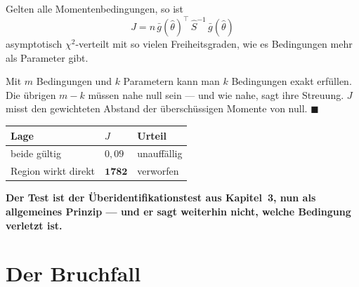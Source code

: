 \begin{merksatz}
Gelten alle Momentenbedingungen, so ist
\[ J = n\,\bar g(\hat\theta)^{\top}\,\hat S^{-1}\,\bar g(\hat\theta) \]
asymptotisch $\chi^{2}$-verteilt mit so vielen Freiheitsgraden, wie es Bedingungen mehr als Parameter gibt.

Mit $m$ Bedingungen und $k$ Parametern kann man $k$ Bedingungen exakt erfüllen. Die übrigen $m-k$ müssen  nahe null sein --- und wie nahe, sagt ihre Streuung. $J$ misst den gewichteten Abstand der überschüssigen Momente von null. $\blacksquare$

\begin{center}
{\small
\renewcommand{\arraystretch}{1.48}
\begin{tabular}{@{}P{3.2cm}P{2.0cm}P{2.4cm}@{}}
\toprule
\textbf{Lage} & $J$ & \textbf{Urteil}\\
\midrule
beide gültig & $0{,}09$ & \textcolor{gruen}{unauffällig}\\
Region wirkt direkt & $\mathbf{1782}$ & \textcolor{akzent}{verworfen}\\
\bottomrule
\end{tabular}}
\end{center}

\begin{center}
\begin{minipage}{0.9\textwidth}
\textbf{Der Test ist der Überidentifikationstest aus Kapitel~3, nun als allgemeines Prinzip --- und er sagt weiterhin nicht, welche Bedingung verletzt ist.}
\end{minipage}
\end{center}
\end{merksatz}

\section{Der Bruchfall}

